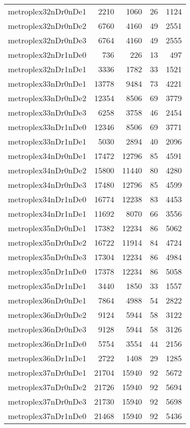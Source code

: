 \begin{longtable}{lrrrr}
metroplex32nDr0nDe1 & 2210 & 1060 & 26 & 1124 \\
metroplex32nDr0nDe2 & 6760 & 4160 & 49 & 2551 \\
metroplex32nDr0nDe3 & 6764 & 4160 & 49 & 2555 \\
metroplex32nDr1nDe0 & 736 & 226 & 13 & 497 \\
metroplex32nDr1nDe1 & 3336 & 1782 & 33 & 1521 \\
metroplex33nDr0nDe1 & 13778 & 9484 & 73 & 4221 \\
metroplex33nDr0nDe2 & 12354 & 8506 & 69 & 3779 \\
metroplex33nDr0nDe3 & 6258 & 3758 & 46 & 2454 \\
metroplex33nDr1nDe0 & 12346 & 8506 & 69 & 3771 \\
metroplex33nDr1nDe1 & 5030 & 2894 & 40 & 2096 \\
metroplex34nDr0nDe1 & 17472 & 12796 & 85 & 4591 \\
metroplex34nDr0nDe2 & 15800 & 11440 & 80 & 4280 \\
metroplex34nDr0nDe3 & 17480 & 12796 & 85 & 4599 \\
metroplex34nDr1nDe0 & 16774 & 12238 & 83 & 4453 \\
metroplex34nDr1nDe1 & 11692 & 8070 & 66 & 3556 \\
metroplex35nDr0nDe1 & 17382 & 12234 & 86 & 5062 \\
metroplex35nDr0nDe2 & 16722 & 11914 & 84 & 4724 \\
metroplex35nDr0nDe3 & 17304 & 12234 & 86 & 4984 \\
metroplex35nDr1nDe0 & 17378 & 12234 & 86 & 5058 \\
metroplex35nDr1nDe1 & 3440 & 1850 & 33 & 1557 \\
metroplex36nDr0nDe1 & 7864 & 4988 & 54 & 2822 \\
metroplex36nDr0nDe2 & 9124 & 5944 & 58 & 3122 \\
metroplex36nDr0nDe3 & 9128 & 5944 & 58 & 3126 \\
metroplex36nDr1nDe0 & 5754 & 3554 & 44 & 2156 \\
metroplex36nDr1nDe1 & 2722 & 1408 & 29 & 1285 \\
metroplex37nDr0nDe1 & 21704 & 15940 & 92 & 5672 \\
metroplex37nDr0nDe2 & 21726 & 15940 & 92 & 5694 \\
metroplex37nDr0nDe3 & 21730 & 15940 & 92 & 5698 \\
metroplex37nDr1nDe0 & 21468 & 15940 & 92 & 5436 \\

\end{longtable}
